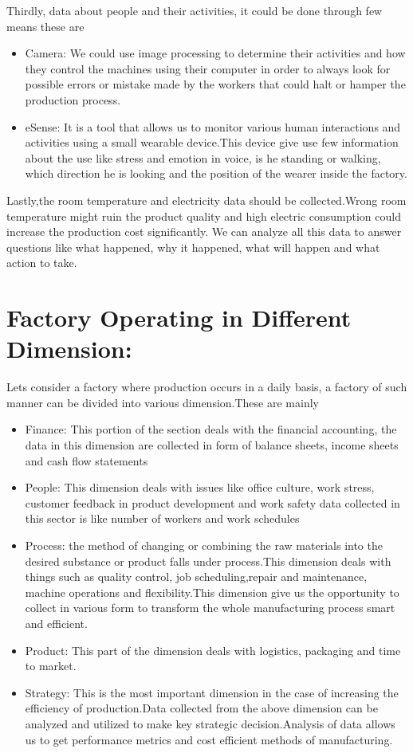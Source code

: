 \documentclass{article}
\begin{document}
\begin{normalsize}
      Thirdly, data about people and their activities, it could be done through few means these are 
       	\begin{itemize}
        
\item{Camera: We could use image processing to determine their activities and how they control the machines using their computer in order to always look for possible errors or mistake made by the workers that could halt or hamper the production process. }
\item{eSense: It is a tool that allows us to monitor various human interactions and activities using a small wearable device.This device give use few information about the use like stress and emotion in voice, is he standing or walking, which direction he is looking and the position of the wearer inside the factory.
} 

	


	\end{itemize}
	Lastly,the room temperature and electricity data should be collected.Wrong room temperature might ruin the product quality and 
high electric consumption could increase the production cost significantly.
	We can analyze all this data to answer questions like what happened, why it happened, what will happen and what action to take.
	\section{Factory Operating in Different Dimension:}
	Lets consider a factory where production occurs in a daily basis, a factory of such manner can be divided into various dimension.These are mainly
	 	\begin{itemize}
        
\item{Finance: This portion of the section deals with the financial accounting, the data in this dimension are collected in form of balance sheets, income sheets and cash flow statements }
\item{People: This dimension deals with issues like office culture, work stress, customer feedback in product development and  work safety data collected in this sector is like number of workers and work schedules} 
\item{Process: the method of changing or combining the raw materials into the desired substance or product falls under process.This dimension deals with things such as quality control, job scheduling,repair and maintenance, machine operations and flexibility.This dimension give us the opportunity to collect in various form to transform the whole manufacturing process smart and efficient.}
\item{Product: This part of the dimension deals with logistics, packaging and time to market.
}
\item{Strategy: This is the most important dimension in the case of increasing the efficiency of production.Data collected from the above dimension can be analyzed and utilized  to make key strategic decision.Analysis of data allows us to get performance metrics  and cost efficient methods of manufacturing.
 
}
\end{itemize}
\end{normalsize}
\end{document}
